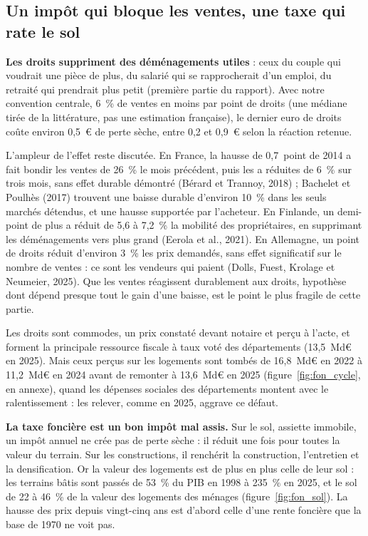 \subsection{Un impôt qui bloque les ventes, une taxe qui rate le sol}

\textbf{Les droits suppriment des déménagements utiles} : ceux du couple qui voudrait une pièce de plus, du salarié qui
se rapprocherait d'un emploi, du retraité qui prendrait plus petit (première partie du rapport). Avec notre convention centrale, 6~\% de ventes en moins par point de droits (une médiane tirée de la
littérature, pas une estimation française), le dernier euro de droits coûte environ 0,5~€ de perte sèche, entre 0,2 et
0,9~€ selon la réaction retenue.

L'ampleur de l'effet reste discutée. En France, la hausse de 0,7~point de 2014 a fait
bondir les ventes de 26~\% le mois précédent, puis les a réduites de 6~\% sur trois mois, sans effet durable démontré
(Bérard et Trannoy, 2018) ; Bachelet et Poulhès (2017) trouvent une baisse durable d'environ 10~\% dans les seuls marchés
détendus, et une hausse supportée par l'acheteur. En Finlande, un demi-point de plus a réduit de 5,6 à 7,2~\% la mobilité
des propriétaires, en supprimant les déménagements vers plus grand (Eerola et al., 2021). En Allemagne, un point de droits
réduit d'environ 3~\% les prix demandés, sans effet significatif sur le nombre de ventes : ce sont les vendeurs qui paient
(Dolls, Fuest, Krolage et Neumeier, 2025). Que les ventes réagissent durablement aux droits, hypothèse dont dépend presque
tout le gain d'une baisse, est le point le plus fragile de cette partie.

Les droits sont commodes, un prix constaté devant notaire et perçu à l'acte, et forment la principale ressource fiscale
à taux voté des départements (13,5~Md€ en 2025). Mais ceux perçus sur les logements sont tombés de 16,8~Md€ en 2022 à
11,2~Md€ en 2024 avant de remonter à 13,6~Md€ en 2025 (figure~\ref{fig:fon_cycle}, en annexe), quand les dépenses
sociales des départements montent avec le ralentissement : les relever, comme en 2025, aggrave ce défaut.

\textbf{La taxe foncière est un bon impôt mal assis.} Sur le sol, assiette immobile, un impôt annuel ne crée pas de perte
sèche : il réduit une fois pour toutes la valeur du terrain. Sur les constructions, il renchérit la construction,
l'entretien et la densification. Or la valeur des logements est de plus en plus celle de leur sol : les terrains bâtis
sont passés de 53~\% du PIB en 1998 à 235~\% en 2025, et le sol de 22 à 46~\% de la valeur des logements des ménages
(figure~\ref{fig:fon_sol}). La hausse des prix depuis vingt-cinq ans est d'abord celle d'une rente foncière que la base de
1970 ne voit pas.

